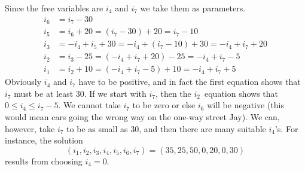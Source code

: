 \begin{exercises}
\begin{answer}
\begin{exparts}
          Since the free variables are $i_4$ and $i_7$ we take them as 
          parameters.
          \begin{equation*}
          \begin{split}
            i_6  &=  i_7-30  \\
            i_5  &=  i_6+20=(i_7-30)+20=i_7-10 \\
            i_3  &=  -i_4+i_5+30=-i_4+(i_7-10)+30=-i_4+i_7+20 \\
            i_2  &=  i_3-25=(-i_4+i_7+20)-25=-i_4+i_7-5 \\
            i_1  &=  i_2+10=(-i_4+i_7-5)+10=-i_4+i_7+5
          \end{split}
          \end{equation*}
          Obviously $i_4$ and $i_7$ have to be positive, and in fact
          the first equation shows that $i_7$ must be at least $30$.
          If we start with $i_7$, then the $i_2$~equation shows that
          $0\leq i_4\leq i_7-5$.
        \partsitem We cannot take $i_7$ to be zero or else $i_6$ will
          be negative (this would mean cars going the wrong way on the
          one-way street Jay).
          We can, however, take $i_7$ to be as small as $30$, and then 
          there are many suitable $i_4$'s.
          For instance, the solution
          \begin{equation*}
            (i_1,i_2,i_3,i_4,i_5,i_6,i_7)
            =
            (35,25,50,0,20,0,30)
          \end{equation*}
          results from choosing $i_4=0$.
      \end{exparts}
    \end{answer}
\end{exercises}
\endinput
